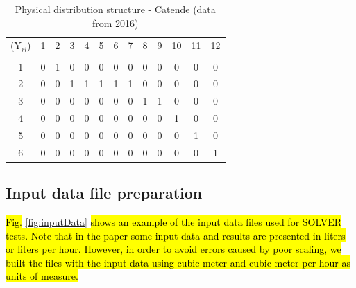 \documentclass{singlecol}
\theoremstyle{TH}{
\newtheorem{lemma}{Lemma}
\newtheorem{theorem}[lemma]{Theorem}
\newtheorem{corrolary}[lemma]{Corrolary}
\newtheorem{conjecture}[lemma]{Conjecture}
\newtheorem{proposition}[lemma]{Proposition}
\newtheorem{claim}[lemma]{Claim}
\newtheorem{stheorem}[lemma]{Wrong Theorem}
\newtheorem{algorithm}{Algorithm}
}
\theoremstyle{THrm}{
\newtheorem{definition}{Definition}[section]
\newtheorem{question}{Question}[section]
\newtheorem{remark}{Remark}
\newtheorem{scheme}{Scheme}
}
\theoremstyle{THhit}{
\newtheorem{case}{Case}[section]
}
\begin{document}
\begin{table}[H]
\begin{center}
	\begin{tabular}{ c c c c c c c c c c c c c } 

		($\mathrm{Y}_{rl}$)	& 1 & 2 & 3 & 4 & 5 & 6 & 7 & 8 & 9 & 10 & 11 & 12  \\
		                                                                      \\
		1	              	& 0 & 1 & 0 & 0 & 0 & 0 & 0 & 0 & 0 &  0 &  0 &  0  \\
		2                 	& 0 & 0 & 1 & 1 & 1 & 1 & 1 & 0 & 0 &  0 &  0 &  0  \\
		3                 	& 0 & 0 & 0 & 0 & 0 & 0 & 0 & 1 & 1 &  0 &  0 &  0  \\
		4                 	& 0 & 0 & 0 & 0 & 0 & 0 & 0 & 0 & 0 &  1 &  0 &  0  \\
		5                 	& 0 & 0 & 0 & 0 & 0 & 0 & 0 & 0 & 0 &  0 &  1 &  0  \\
	    6                 	& 0 & 0 & 0 & 0 & 0 & 0 & 0 & 0 & 0 &  0 &  0 &  1  \\
	\end{tabular}
\caption{Physical distribution structure - Catende (data from 2016)}
\label{tab:phyDitStr}
\end{center}
\end{table}

\subsection{Input data file preparation}
\label{sec:dataPreparation}

\hl{Fig.} \ref{fig:inputData} \hl{shows an example of the input data files used for SOLVER tests. Note that in the paper some input data and results are presented in liters or liters per hour. However, in order to avoid errors caused by poor scaling, we built the files with the input data using cubic meter and cubic meter per hour as units of measure.}
\end{document}
